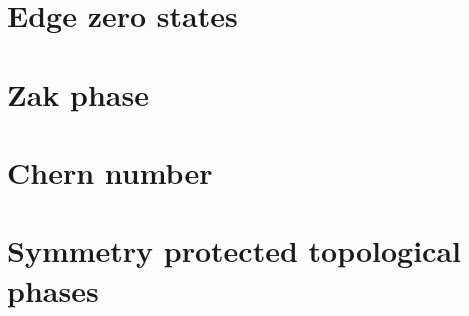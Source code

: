 \section{Edge zero states}
\label{sec:edge_zero_states}
%
%
\section{Zak phase}
\label{sec:zak_phase}
%
%
\section{Chern number}
\label{sec:chern_number}
%
%
\section{Symmetry protected topological phases}
\label{sec:symmetry_protected_topological_phases}
